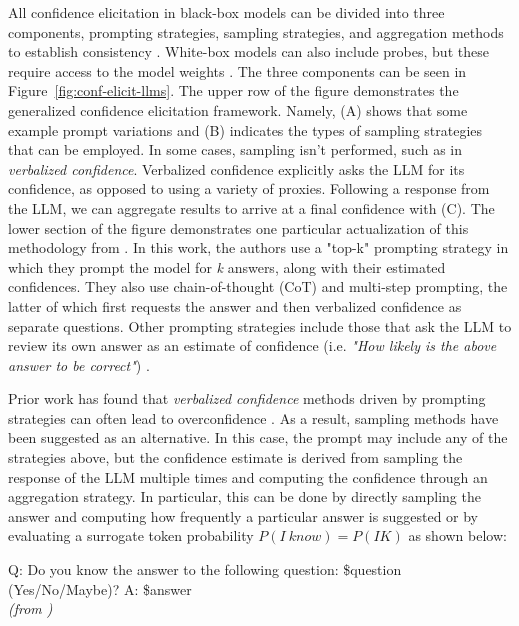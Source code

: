 All confidence elicitation in black-box models can be divided into three components, prompting strategies, sampling strategies, and aggregation methods to establish consistency \citep{xiong2024can}. White-box models can also include probes, but these require access to the model weights \citep{mahaut-etal-2024-factual}. The three components can be seen in Figure~\ref{fig:conf-elicit-llms}. The upper row of the figure demonstrates the generalized confidence elicitation framework. Namely, (A) shows that some example prompt variations and (B) indicates the types of sampling strategies that can be employed. In some cases, sampling isn't performed, such as in \emph{verbalized confidence}. Verbalized confidence explicitly asks the LLM for its confidence, as opposed to using a variety of proxies. Following a response from the LLM, we can aggregate results to arrive at a final confidence with (C). The lower section of the figure demonstrates one particular actualization of this methodology from \citet{tian-etal-2023-just}. In this work, the authors use a "top-k" prompting strategy in which they prompt the model for \emph{k} answers, along with their estimated confidences. They also use chain-of-thought (CoT) and multi-step prompting, the latter of which first requests the answer and then verbalized confidence as separate questions. Other prompting strategies include those that ask the LLM to review its own answer as an estimate of confidence (i.e. \emph{"How likely is the above answer to be correct"}) \citep{xiong2024can}. 

Prior work has found that \emph{verbalized confidence} methods driven by prompting strategies can often lead to overconfidence \citep{zhou-etal-2024-relying, rivera-etal-2024-combining}. As a result, sampling methods have been suggested as an alternative. In this case, the prompt may include any of the strategies above, but the confidence estimate is derived from sampling the response of the LLM multiple times and computing the confidence through an aggregation strategy. In particular, this can be done by directly sampling the answer and computing how frequently a particular answer is suggested \citep{huangLookYouLeap2023a} or by evaluating a surrogate token probability $P(I\ know) = P(IK)$ \citep{kadavathLanguageModelsMostly2022} as shown below:

\begin{displayquote}
Q: Do you know the answer to the following question: \$question (Yes/No/Maybe)?
A: \$answer \\
\emph{(from \citet{mahaut-etal-2024-factual})}
\end{displayquote}

